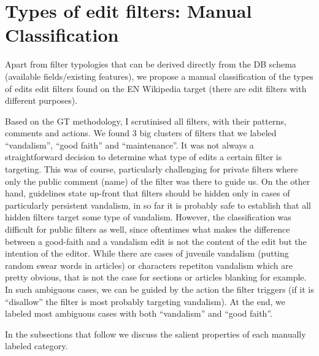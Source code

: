 \section{Types of edit filters: Manual Classification}
\label{sec:manual-classification}

Apart from filter typologies that can be derived directly from the DB schema (available fields/existing features), we propose a manual classification of the types of edits edit filters found on the EN Wikipedia target (there are edit filters with different purposes).

Based on the GT methodology, I scrutinised all filters, with their patterns, comments and actions. %
We found 3 big clusters of filters that we labeled ``vandalism'', ``good faith'' and ``maintenance''.
It was not always a straightforward decision to determine what type of edits a certain filter is targeting.
This was of course, particularly challenging for private filters where only the public comment (name) of the filter was there to guide us.
On the other hand, guidelines state up-front that filters should be hidden only in cases of particularly persistent vandalism, in so far it is probably safe to establish that all hidden filters target some type of vandalism.
However, the classification was difficult for public filters as well, since oftentimes what makes the difference between a good-faith and a vandalism edit is not the content of the edit but the intention of the editor.
While there are cases of juvenile vandalism (putting random swear words in articles) or characters repetiton vandalism which are pretty obvious, that is not the case for sections or articles blanking for example. %
In such ambiguous cases, we can be guided by the action the filter triggers (if it is ``disallow'' the filter is most probably targeting vandalism).
At the end, we labeled most ambiguous cases with both ``vandalism'' and ``good faith''.

In the subsections that follow we discuss the salient properties of each manually labeled category.

